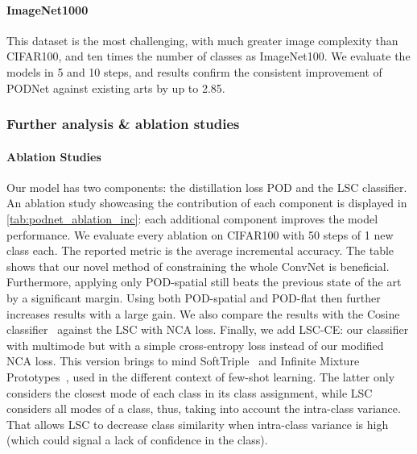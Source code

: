 \paragraph{ImageNet1000} This dataset is the most challenging, with much greater image complexity
than CIFAR100, and ten times the number of classes as ImageNet100. We evaluate the models in 5 and
10 steps, and results confirm the consistent improvement of PODNet against existing arts by up to
2.85\pp.



\subsubsection{Further analysis \& ablation studies}
\label{sec:podnet_ablation}

\paragraph{Ablation Studies}
Our model has two components: the distillation loss \ac{POD} and the \ac{LSC} classifier. An
ablation study showcasing the contribution of each component is displayed in
\autoref{tab:podnet_ablation_inc}: each additional component improves the model performance. We
evaluate every ablation on CIFAR100 with 50 steps of 1 new class each. The reported metric is the
average incremental accuracy. The table shows that our novel method of constraining the whole
\ac{ConvNet} is beneficial. Furthermore, applying only POD-spatial still beats the previous state of
the art by a significant margin. Using both POD-spatial and POD-flat then further increases results
with a large gain. We also compare the results with the Cosine
classifier~\citep{luo2018cosine_classifier,hou2019ucir} against the \acf{LSC} with NCA loss.
Finally, we add \ac{LSC}-CE: our classifier with multimode but with a simple cross-entropy loss
instead of our modified NCA loss. This version brings to mind SoftTriple~\citep{qian2019softtriple}
and Infinite Mixture Prototypes~\citep{allen2019infinitemixtureproto}, used in the different context
of few-shot learning. The latter only considers the closest mode of each class in its class
assignment, while \ac{LSC} considers all modes of a class, thus, taking into account the intra-class
variance. That allows \ac{LSC} to decrease class similarity when intra-class variance is high (which
could signal a lack of confidence in the class).




